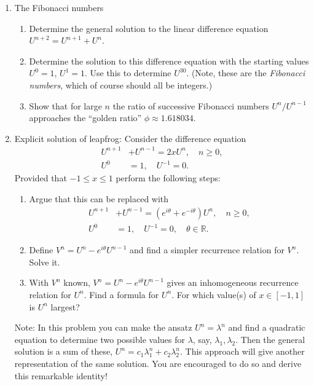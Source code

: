 \documentclass[10pt]{amsart}
\begin{document}
\begin{enumerate}[label={\bf Problem~{\arabic*}:}]


\mline 
\item  The Fibonacci numbers

\begin{enumerate}
\item Determine the general solution to the linear difference equation
$U^{n+2} = U^{n+1} + U^n$.

\item Determine the solution to this difference equation with the starting
values $U^0=1$, $U^1=1$.  Use this to determine $U^{30}$.
(Note, these are the {\em Fibonacci numbers}, which of course should all be
integers.)

\item Show that for large $n$ the ratio of successive Fibonacci numbers
  $U^n/U^{n-1}$ approaches the ``golden ratio'' $\phi \approx 1.618034$.
\end{enumerate}


\mline
\item Explicit solution of leapfrog:  Consider the difference equation
  \begin{align*}
    U^{n+1} &+ U^{n-1} = 2x U^n, \quad n \geq 0,\\
    U^0 &= 1, \quad U^{-1} = 0.
  \end{align*}
  Provided that $-1 \leq x \leq 1$ perform the following steps:

\begin{enumerate}
\item Argue that this can be replaced with
   \begin{align*}
    U^{n+1} &+ U^{n-1} = (e^{i \theta} + e^{- i \theta}) U^n, \quad n \geq 0,\\
    U^0 &= 1, \quad U^{-1} = 0, \quad \theta \in \mathbb R.
   \end{align*}
 \item Define $V^n = U^n - e^{i \theta} U^{n-1}$ and find a simpler recurrence relation for $V^n$.  Solve it.
 \item With $V^n$ known, $V^n = U^n - e^{i \theta} U^{n-1}$ gives an inhomogeneous recurrence relation for $U^n$.  Find a formula for $U^n$. For which value(s) of $x \in [-1,1]$ is $U^n$ largest?
\end{enumerate} 

Note: In this problem you can make the ansatz $U^n = \lambda^n$ and find a quadratic equation to determine two possible values for $\lambda$, say, $\lambda_1,\lambda_2$. Then the general solution is a sum of these, $U^n = c_1 \lambda_1^n + c_2 \lambda_2^n$.  This approach will give another representation of the same solution. You are encouraged to do so and derive this remarkable identity!


\end{enumerate}
\end{document}
